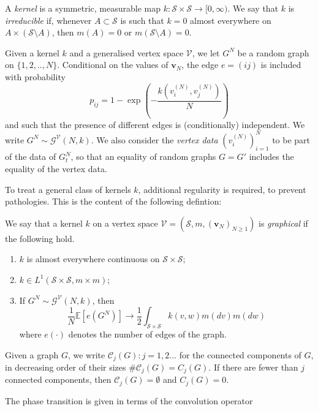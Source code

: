 \begin{definition}
    A \emph{kernel} is a symmetric, measurable map $k: \mathcal{S}\times \mathcal{S} \rightarrow [0, \infty).$ We say that $k$ is \emph{irreducible} if, whenever $A\subset \mathcal{S}$ is such that $k=0$ almost everywhere on $A\times (\mathcal{S}\setminus A)$, then $m(A)=0$ or $m(\mathcal{S}\setminus A)=0$. 
    \end{definition} \begin{definition}\label{definition of GN} Given a kernel $k$ and a generalised vertex space $\mathcal{V}$, we let
    $G^N$ be a random graph on $\{1, 2,..,N\}$. Conditional on the values of $\mathbf{v}_N$, the edge $e=(ij)$ is included with probability \begin{equation}
        p_{ij}=1-\exp\left(-\frac{k(v^{(N)}_i,v^{(N)}_j)}{N} \right)
    \end{equation} and such that the presence of different edges is (conditionally) independent. We write $G^N\sim\mathcal{G}^\mathcal{V}(N,k)$. We also consider the \emph{vertex data}  $(v^{(N)}_i)_{i=1}^N$ to be part of the data of $G^N_t$, so that an equality of random graphs $G=G'$ includes the equality of the vertex data.
\end{definition} To treat a general class of kernels $k$, additional regularity is required, to prevent pathologies. This is the content of the following defintion: \begin{definition}
    We say that a kernel $k$ on a vertex space $\mathcal{V}=(\mathcal{S}, m, (\mathbf{v}_N)_{N\geq 1})$ is \emph{graphical} if the following hold. 
    \begin{enumerate}[label=\roman{*}).]
        \item $k$ is almost everywhere continuous on $\mathcal{S}\times\mathcal{S};$
        \item $k \in L^1(\mathcal{S}\times \mathcal{S}, m \times m)$;
        \item If $G^N \sim \mathcal{G}^\mathcal{V}(N,k)$, then
        \begin{equation}
            \frac{1}{N}\mathbb{E}\left[e\left(G^N\right)\right]\rightarrow \frac{1}{2}\int_{\mathcal{S}\times \mathcal{S}} k(v,w)m(dv)m(dw)
        \end{equation} where $e(\cdot)$ denotes the number of edges of the graph.
    \end{enumerate}
\end{definition}  \begin{definition}
 Given a graph $G$, we write $\mathcal{C}_j(G): j=1, 2...$ for the connected components of $G$, in decreasing order of their sizes $\#\mathcal{C}_j(G)=C_j(G)$. If there are fewer than $j$ connected components, then $\mathcal{C}_j(G)=\emptyset$ and $C_j(G)=0$.
\end{definition}The phase transition is given in terms of the convolution operator
